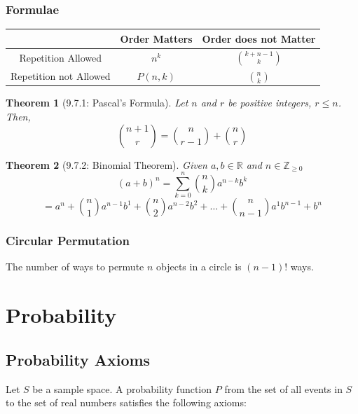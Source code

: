 \documentclass{article}
\theoremstyle{plain}
\newtheorem{theorem}{Theorem}[section]
\theoremstyle{definition}
\theoremstyle{remark}
\begin{document}
\subsubsection*{Formulae}
\begin{center}
\begin{tabular}{|c|c|c|}
    \hline
    & Order Matters & Order does not Matter \\
    \hline
    Repetition Allowed & $n^k$ & $\binom{k+n-1}{k}$ \\
    \hline
    Repetition not Allowed & $P(n,k)$ & $\binom{n}{k}$ \\
    \hline
\end{tabular}
\end{center}
 
\begin{theorem}[9.7.1: Pascal's Formula]
    Let $n$ and $r$ be positive integers, $r \leq n$. Then,
    \[ \binom{n+1}{r} = \binom{n}{r-1} + \binom{n}{r} \]
\end{theorem}
 
\begin{theorem}[9.7.2: Binomial Theorem]
    Given $a, b \in \mathbb{R}$ and $n \in \mathbb{Z}_{\geq 0}$
    \[ (a+b)^n = \sum_{k=0}^{n} \binom{n}{k} a^{n-k} b^k \]
    \[ = a^n + \binom{n}{1}a^{n-1}b^1 + \binom{n}{2}a^{n-2}b^2 + \dots + \binom{n}{n-1}a^1 b^{n-1} + b^n \]
\end{theorem}
 
\subsubsection*{Circular Permutation}
The number of ways to permute $n$ objects in a circle is $(n-1)!$ ways.

\begin{center}
\end{center}

\section{Probability}
 
\subsection{Probability Axioms}
Let $S$ be a sample space. A probability function $P$ from the set of all events in $S$ to the set of real numbers satisfies the following axioms:
 
\end{document}
